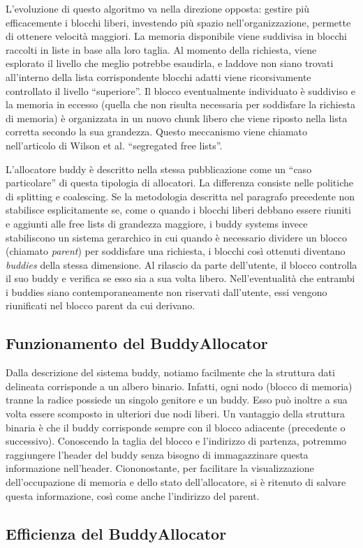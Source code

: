 L’evoluzione di questo algoritmo va nella direzione opposta: gestire più efficacemente i blocchi liberi, investendo più spazio nell’organizzazione, permette di ottenere velocità maggiori. La memoria disponibile viene suddivisa in blocchi raccolti in liste in base alla loro taglia. Al momento della richiesta, viene esplorato il livello che meglio potrebbe esaudirla, e laddove non siano trovati all’interno della lista corrispondente blocchi adatti viene ricorsivamente controllato il livello ``superiore''. Il blocco eventualmente individuato è suddiviso e la memoria in eccesso (quella che non risulta necessaria per soddisfare la richiesta di memoria) è organizzata in un nuovo chunk libero che viene riposto nella lista corretta secondo la sua grandezza. Questo meccanismo viene chiamato nell’articolo di Wilson et al. ``segregated free lists''.

L’allocatore buddy è descritto nella stessa pubblicazione come un ``caso particolare'' di questa tipologia di allocatori. La differenza consiste nelle politiche di splitting e coalescing. Se la metodologia descritta nel paragrafo precedente non stabilisce esplicitamente se, come o quando i blocchi liberi debbano essere riuniti e aggiunti alle free lists di grandezza maggiore, i buddy systems invece stabiliscono un sistema gerarchico in cui quando è necessario dividere un blocco (chiamato \textit{parent}) per soddisfare una richiesta, i blocchi così ottenuti diventano \textit{buddies} della stessa dimensione. Al rilascio da parte dell’utente, il blocco controlla il suo buddy e verifica se esso sia a sua volta libero. Nell’eventualità che entrambi i buddies siano contemporaneamente non riservati dall’utente, essi vengono riunificati nel blocco parent da cui derivano.

\subsection{Funzionamento del BuddyAllocator}

Dalla descrizione del sistema buddy, notiamo facilmente che la struttura dati delineata corrisponde a un albero binario. Infatti, ogni nodo (blocco di memoria) tranne la radice possiede un singolo genitore e un buddy. Esso può inoltre a sua volta essere scomposto in ulteriori due nodi liberi. Un vantaggio della struttura binaria è che il buddy corrisponde sempre con il blocco adiacente (precedente o successivo). Conoscendo la taglia del blocco e l’indirizzo di partenza, potremmo raggiungere l’header del buddy senza bisogno di immagazzinare questa informazione nell’header. Ciononostante, per facilitare la visualizzazione dell’occupazione di memoria e dello stato dell’allocatore, si è ritenuto di salvare questa informazione, così come anche l’indirizzo del parent.

\subsection{Efficienza del BuddyAllocator}
